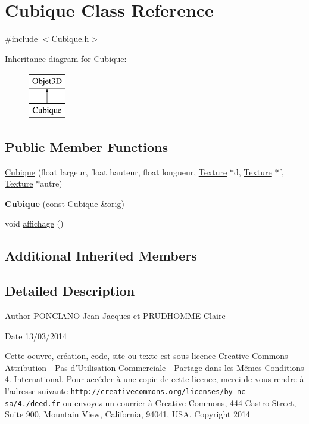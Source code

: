 \hypertarget{classCubique}{\section{Cubique Class Reference}
\label{classCubique}
}


{\ttfamily \#include $<$Cubique.\-h$>$}

Inheritance diagram for Cubique\-:\begin{figure}[H]
\begin{center}
\leavevmode
\includegraphics[height=2.000000cm]{classCubique}
\end{center}
\end{figure}
\subsection*{Public Member Functions}
\begin{DoxyCompactItemize}
\item 
\hyperlink{classCubique_a01a053ef2fad8dcb5a50ad1a3c809efe}{Cubique} (float largeur, float hauteur, float longueur, \hyperlink{classTexture}{Texture} $\ast$d, \hyperlink{classTexture}{Texture} $\ast$f, \hyperlink{classTexture}{Texture} $\ast$autre)
\item 
\hypertarget{classCubique_aa0045d5d037f086aaf3d584eea922149}{{\bfseries Cubique} (const \hyperlink{classCubique}{Cubique} \&orig)}\label{classCubique_aa0045d5d037f086aaf3d584eea922149}

\item 
void \hyperlink{classCubique_aa84591f1589b4f5cf4eafd7d98ebec50}{affichage} ()
\end{DoxyCompactItemize}
\subsection*{Additional Inherited Members}


\subsection{Detailed Description}
\begin{DoxyAuthor}{Author}
P\-O\-N\-C\-I\-A\-N\-O Jean-\/\-Jacques et P\-R\-U\-D\-H\-O\-M\-M\-E Claire 
\end{DoxyAuthor}
\begin{DoxyDate}{Date}
13/03/2014
\end{DoxyDate}
Cette oeuvre, création, code, site ou texte est sous licence Creative Commons Attribution -\/ Pas d’\-Utilisation Commerciale -\/ Partage dans les Mêmes Conditions 4. International. Pour accéder à une copie de cette licence, merci de vous rendre à l'adresse suivante \href{http://creativecommons.org/licenses/by-nc-sa/4.0/deed.fr}{\tt http\-://creativecommons.\-org/licenses/by-\/nc-\/sa/4./deed.\-fr} ou envoyez un courrier à Creative Commons, 444 Castro Street, Suite 900, Mountain View, California, 94041, U\-S\-A. Copyright 2014


